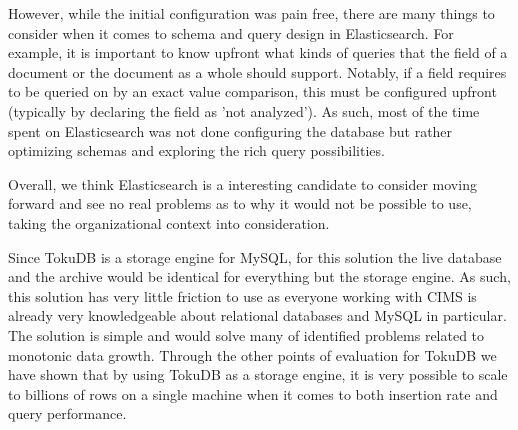 However, while the initial configuration was pain free, there are many things to consider when it comes to schema and query design in Elasticsearch. For example, it is important to know upfront what kinds of queries that the field of a document or the document as a whole should support. Notably, if a field requires to be queried on by an exact value comparison, this must be configured upfront (typically by declaring the field as 'not analyzed'). As such, most of the time spent on Elasticsearch was not done configuring the database but rather optimizing schemas and exploring the rich query possibilities.

Overall, we think Elasticsearch is a interesting candidate to consider moving forward and see no real problems as to why it would not be possible to use, taking the organizational context into consideration.

Since TokuDB is a storage engine for MySQL, for this solution the live database and the archive would be identical for everything but the storage engine. As such, this solution has very little friction to use as everyone working with CIMS is already very knowledgeable about relational databases and MySQL in particular. The solution is simple and would solve many of identified problems related to monotonic data growth. Through the other points of evaluation for TokuDB we have shown that by using TokuDB as a storage engine, it is very possible to scale to billions of rows on a single machine when it comes to both insertion rate and query performance.